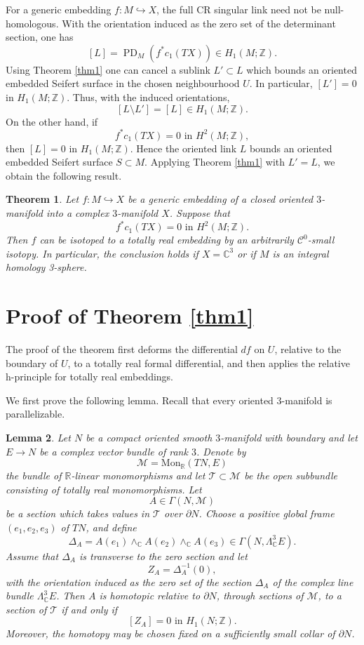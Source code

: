 \documentclass[12pt]{amsart}
\newtheorem{theorem}{Theorem}%
\newtheorem{lemma}[theorem]{Lemma}
\theoremstyle{definition}
\newcommand{\C}{\mathbb{C}}
\newcommand{\Z}{\mathbb{Z}}
\newcommand{\R}{\mathbb{R}}
\newcommand{\PD}{\operatorname{PD}}
\newcommand{\cC}{\mathcal{C}}
\newcommand{\cM}{\mathcal{M}}
\newcommand{\cT}{\mathcal{T}}
\newcommand\hra{\hookrightarrow}
\newcommand\Mon{\mathrm{Mon}}
\numberwithin{equation}{section}
\begin{document}
For a generic embedding $f:M\hra X$, the full CR singular link need not be null-homologous. With the orientation induced as the zero set of the determinant section, one has
\[[L]=\PD_M\left(f^*c_1(TX)\right)\in H_1(M;\Z).\]
Using Theorem \ref{thm1} one can cancel a sublink $L'\subset L$ which bounds an oriented embedded Seifert surface in the chosen neighbourhood $U$. In particular, $[L']=0$ in $H_1(M;\Z)$. Thus, with the induced orientations, 
\[[L\setminus L']=[L]\in H_1(M;\Z).\]
On the other hand, if
\[f^*c_1(TX)=0 \text{\ in\ } H^2(M;\Z),\]
then $[L]=0$ in $H_1(M;\Z)$. Hence the oriented link $L$ bounds an oriented embedded Seifert surface $S\subset M$. Applying Theorem \ref{thm1} with $L'=L$, we obtain the following result.


\begin{theorem}
Let $f:M\hra X$ be a generic embedding of a closed oriented $3$-manifold into a complex $3$-manifold $X$. Suppose that
\[f^*c_1(TX)=0\text{\ in\ } H^2(M;\Z).\]
Then $f$ can be isotoped to a totally real embedding by an arbitrarily $\cC^0$-small isotopy. In particular, the conclusion holds if $X=\C^3$ or if $M$ is an integral homology 3-sphere.  %
\end{theorem}



\section{Proof of Theorem \ref{thm1}}
The proof of the theorem first deforms the differential $df$ on $U$, relative to the boundary of $U$, to a totally real formal differential, and then applies the relative h-principle for totally real embeddings.

 We first prove the following lemma. Recall that every oriented $3$-manifold is parallelizable.

\begin{lemma}\label{lemma}
Let $N$ be a compact oriented smooth $3$-manifold with boundary and let $E\to N$ be a complex vector bundle of rank $3$. Denote by 
\[\cM=\Mon_{\R}(TN,E)\] 
the bundle of $\R$-linear monomorphisms and let $\cT\subset \cM$ be the open subbundle consisting of totally real monomorphisms. Let
\[A\in \Gamma(N,\mathcal M)\]
be a section which takes values in $\cT$ over $\partial N$.  Choose a positive global frame $(e_1,e_2,e_3)$ of $TN$, and define
\[\Delta_A=A(e_1)\wedge_{\C} A(e_2)\wedge_{\C} A(e_3)
        \in \Gamma\left(N,\Lambda^3_{\C}E\right).\]
Assume that $\Delta_A$ is transverse to the zero section and let
\[Z_A=\Delta_A^{-1}(0),\]
with the orientation induced as the zero set of the section $\Delta_A$ of the complex line bundle $\Lambda^3_{\C}E$. 
Then $A$ is homotopic relative to $\partial N$, through sections of $\mathcal M$, to a section of $\mathcal T$ if and only if 
\[[Z_A]=0 \text{\ in\ } H_1(N;\Z).\]
Moreover, the homotopy may be chosen fixed on a sufficiently small collar of $\partial N$.
\end{lemma}
\end{document}
